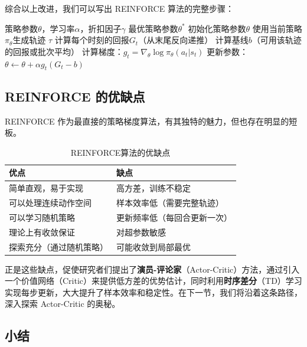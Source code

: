 \documentclass[lang=cn,zihao=-4,a4paper,fontset=windows]{beautybook}
\begin{document}
综合以上改进，我们可以写出 REINFORCE 算法的完整步骤：

\begin{algorithm}[H]
\caption{REINFORCE with Baseline}
\begin{algorithmic}[1]
\REQUIRE 策略参数$\theta$，学习率$\alpha$，折扣因子$\gamma$
\ENSURE 最优策略参数$\theta^*$
\STATE 初始化策略参数$\theta$
    \STATE 使用当前策略$\pi_\theta$生成轨迹 $\tau$
    \STATE 计算每个时刻的回报$G_t$（从末尾反向递推）
    \STATE 计算基线$b$（可用该轨迹的回报或批次平均）
        \STATE 计算梯度：$g_t = \nabla_\theta \log \pi_\theta(a_t|s_t)$
        \STATE 更新参数：$\theta \leftarrow \theta + \alpha g_t (G_t - b)$
    \ENDFOR
\ENDFOR
\end{algorithmic}
\end{algorithm}

\subsection{REINFORCE 的优缺点}

REINFORCE 作为最直接的策略梯度算法，有其独特的魅力，但也存在明显的短板。

\begin{table}[H]
\centering
\caption{REINFORCE算法的优缺点}
\begin{tabular}{p{}p{}}
\toprule
\textbf{优点} & \textbf{缺点} \\
\midrule
简单直观，易于实现 & 高方差，训练不稳定 \\
可以处理连续动作空间 & 样本效率低（需要完整轨迹） \\
可以学习随机策略 & 更新频率低（每回合更新一次） \\
理论上有收敛保证 & 对超参数敏感 \\
探索充分（通过随机策略） & 可能收敛到局部最优 \\
\bottomrule
\end{tabular}
\end{table}

正是这些缺点，促使研究者们提出了\textbf{演员-评论家}（Actor-Critic）方法，通过引入一个价值网络（Critic）来提供低方差的优势估计，同时利用\textbf{时序差分}（TD）学习实现每步更新，大大提升了样本效率和稳定性。在下一节，我们将沿着这条路径，深入探索 Actor-Critic 的奥秘。

\subsection{小结}
\end{document}
